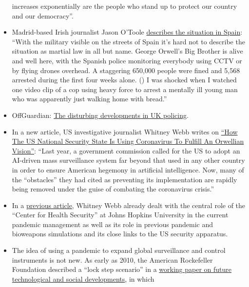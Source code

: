 \begin{itemize}
  increases exponentially are the people who stand up to protect our
  country and our democracy''.
\item
  Madrid-based Irish journalist Jason O'Toole
  \href{https://www.rt.com/op-ed/486350-spain-tough-rules-covid-19-lockdown/}{describes
  the situation in Spain}: ``With the military visible on the streets of
  Spain it's hard not to describe the situation as martial law in all
  but name. George Orwell's Big Brother is alive and well here, with the
  Spanish police monitoring everybody using CCTV or by flying drones
  overhead. A staggering 650,000 people were fined and 5,568 arrested
  during the first four weeks alone. () I was shocked when I watched one
  video clip of a cop using heavy force to arrest a mentally ill young
  man who was apparently just walking home with bread.''
\item
  OffGuardian:
  \href{https://off-guardian.org/2020/04/18/the-disturbing-developments-in-uk-policing/}{The
  disturbing developments in UK policing}.
\item
  In a new article, US investigative journalist Whitney Webb writes on
  \href{https://www.thelastamericanvagabond.com/top-news/techno-tyranny-how-us-national-security-state-using-coronavirus-fulfill-orwellian-vision/}{``How
  The US National Security State Is Using Coronavirus To Fulfill An
  Orwellian Vision''}: ``Last year, a government commission called for
  the US to adopt an AI-driven mass surveillance system far beyond that
  used in any other country in order to ensure American hegemony in
  artificial intelligence. Now, many of the ``obstacles'' they had cited
  as preventing its implementation are rapidly being removed under the
  guise of combating the coronavirus crisis.''
\item
  In a
  \href{https://www.thelastamericanvagabond.com/top-news/all-roads-lead-dark-winter/}{previous
  article}, Whitney Webb already dealt with the central role of the
  ``Center for Health Security'' at Johns Hopkins University in the
  current pandemic management as well as its role in previous pandemic
  and bioweapons simulations and its close links to the US security
  apparatus.
\item
  The idea of using a pandemic to expand global surveillance and control
  instruments is not new. As early as 2010, the American Rockefeller
  Foundation described a ``lock step scenario'' in a
  \href{https://swprs.files.wordpress.com/2020/04/rockefeller-foundation-scenarios-2010.pdf}{working
  paper on future technological and social developments}, in which

\end{itemize}
